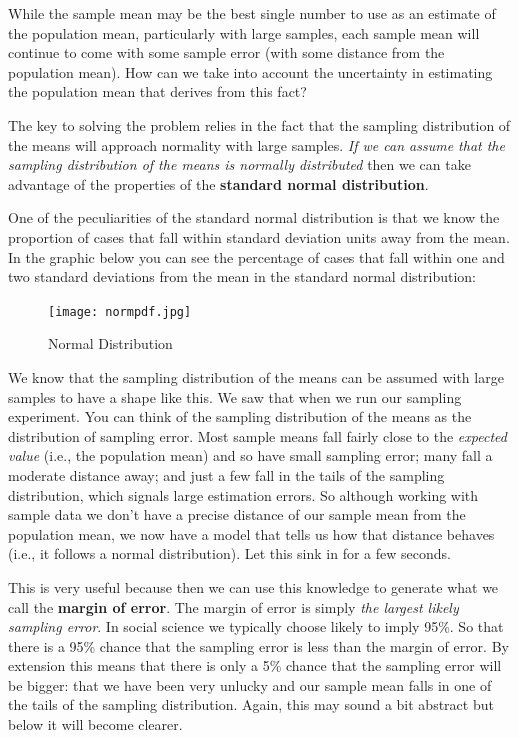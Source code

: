 \documentclass[
]{book}
\begin{document}
While the sample mean may be the best single number to use as an estimate of the population mean, particularly with large samples, each sample mean will continue to come with some sample error (with some distance from the population mean). How can we take into account the uncertainty in estimating the population mean that derives from this fact?

The key to solving the problem relies in the fact that the sampling distribution of the means will approach normality with large samples. \emph{If we can assume that the sampling distribution of the means is normally distributed} then we can take advantage of the properties of the \textbf{standard normal distribution}.

One of the peculiarities of the standard normal distribution is that we know the proportion of cases that fall within standard deviation units away from the mean. In the graphic below you can see the percentage of cases that fall within one and two standard deviations from the mean in the standard normal distribution:

\begin{figure}
\centering
\texttt{[image: normpdf.jpg]}
\caption{Normal Distribution}
\end{figure}

We know that the sampling distribution of the means can be assumed with large samples to have a shape like this. We saw that when we run our sampling experiment. You can think of the sampling distribution of the means as the distribution of sampling error. Most sample means fall fairly close to the \emph{expected value} (i.e., the population mean) and so have small sampling error; many fall a moderate distance away; and just a few fall in the tails of the sampling distribution, which signals large estimation errors. So although working with sample data we don't have a precise distance of our sample mean from the population mean, we now have a model that tells us how that distance behaves (i.e., it follows a normal distribution). Let this sink in for a few seconds.

This is very useful because then we can use this knowledge to generate what we call the \textbf{margin of error}. The margin of error is simply \emph{the largest likely sampling error}. In social science we typically choose likely to imply 95\%. So that there is a 95\% chance that the sampling error is less than the margin of error. By extension this means that there is only a 5\% chance that the sampling error will be bigger: that we have been very unlucky and our sample mean falls in one of the tails of the sampling distribution. Again, this may sound a bit abstract but below it will become clearer.
\end{document}
